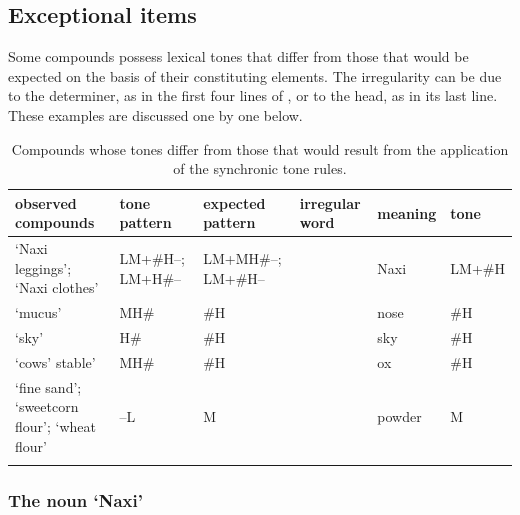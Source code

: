 \subsection{Exceptional items}
\label{sec:exceptionalitems}

Some compounds possess lexical tones that differ from those that would be expected on the basis of
their constituting elements. The irregularity can be due to the determiner, as in the first four lines of , or to the head, as in its last line. These examples
are discussed one by one below.

\begin{table}%
    \caption{Compounds whose tones differ from those that would result from the application of the synchronic tone rules.}
{\renewcommand{\arraystretch}{1.35}
\begin{tabularx}{\textwidth}{P{50mm} P{30mm} P{30mm} l l l }
    \lsptoprule
 observed compounds & tone pattern & expected pattern & irregular word & meaning & tone\\ 
	\midrule
  ‘Naxi leggings’;  ‘Naxi clothes’ & LM+\#H--; \newline LM+H\#-- & LM+MH\#--; \newline LM+\#H-- & 	 & Naxi & LM+\#H\\
  ‘mucus’ & MH\# & \#H &  & nose & \#H\\
  ‘sky’ & H\# & \#H & 	 & sky & \#H\\
  ‘cows’ stable’ & MH\# & \#H &  & ox & \#H\\
\addlinespace \hdashline \addlinespace {} ‘fine sand’;  ‘sweetcorn flour’;  ‘wheat flour’ & --L & M &  & powder & M\\
    \lspbottomrule
\end{tabularx}}
\label{tab:compoundsdiffer}
\end{table}

\subsubsection{The noun ‘Naxi’}
\label{sec:thenounnaxi}

